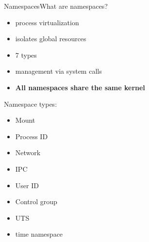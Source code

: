 \large
\begin{frame}{Namespaces}{What are namespaces?}
\begin{minipage}{0.5\textwidth}
    

\begin{itemize}
    \setlength\itemsep{1em}
    \item process virtualization
    \item isolates global resources
    \item 7 types 
    \item management via system calls
    \item \textbf{All namespaces share the same kernel}
\end{itemize}
\end{minipage}
\hfill
\begin{minipage}{0.3\textwidth}
    \begin{greenblock}{Namespace types:}
        \begin{itemize}
            \item Mount
            \item Process ID
            \item Network
            \item IPC
            \item User ID
            \item Control group
        \item UTS
            \item time namespace
    \end{itemize}
    \end{greenblock}
\end{minipage}
\end{frame}